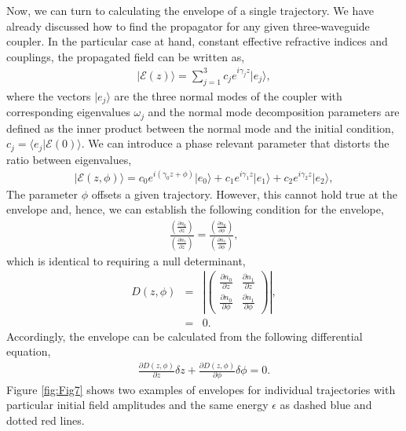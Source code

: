 \documentclass[9pt,twocolumn,twoside]{osajnl}
\begin{document}
Now, we can turn to calculating the envelope of a single trajectory. 
We have already discussed how to find the propagator for any given three-waveguide coupler. 
In the particular case at hand, constant effective refractive indices and couplings, the propagated field can be written as, 
\begin{eqnarray}
	\vert \mathcal{E}(z) \rangle =  \sum_{j=1}^{3} c_j e^{i \gamma_j z} \vert e_j \rangle,
\end{eqnarray}
where the vectors $\vert e_j \rangle$ are the three normal modes of the coupler with corresponding eigenvalues $\omega_j$ and the normal mode decomposition parameters are defined as the inner product between the normal mode and the initial condition,  $c_{j} = \langle e_{j} \vert \mathcal{E}(0) \rangle$. 
We can introduce a phase relevant parameter that distorts the ratio between eigenvalues, 
\begin{eqnarray}
\vert \mathcal{E}(z, \phi) \rangle = c_0 e^{i \left( \gamma_0 z + \phi \right) } \vert e_0 \rangle + c_1 e^{i \gamma_1 z} \vert e_1 \rangle + c_2 e^{i \gamma_2 z} \vert e_2 \rangle,
\end{eqnarray}
The parameter $\phi$ offsets a given trajectory. 
However, this cannot hold true at the envelope and, hence, we can establish the following condition for the envelope,
\begin{eqnarray}
	\frac{ (\frac{\partial n_0}{\partial z}) }{ (\frac{\partial n_1}{\partial z}) } = \frac{( \frac{\partial n_0}{\partial \phi})}{(\frac{\partial n_1}{\partial \phi}) } ,
\end{eqnarray}
which is identical to requiring a null determinant,
\begin{eqnarray}
	D(z, \phi) &=& \left\vert \left(  \begin{array}{cc} 
		\frac{\partial n_0}{\partial z} & \frac{\partial n_1}{\partial z} \\
		\frac{\partial n_0}{\partial \phi} & \frac{\partial n_1}{\partial \phi} 
	\end{array} \right) \right\vert, \\
	&=& 0.
\end{eqnarray}
Accordingly, the envelope can be calculated from the following differential equation,
\begin{eqnarray}
	\frac{\partial D(z,\phi)}{\partial z} \delta z +
	\frac{\partial D(z,\phi)}{\partial \phi} \delta \phi = 0. \label{eq:EnvInd}
\end{eqnarray}
Figure \ref{fig:Fig7} shows two examples of envelopes for individual trajectories with particular initial field amplitudes and the same energy $\epsilon$ as dashed blue and dotted red lines. 
\end{document}
